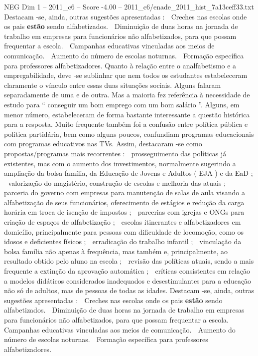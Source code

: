 \begin{textsample}{NEG Dim 1 – 2011\_c6 – Score -4.00 – 2011\_c6/enade\_2011\_hist\_7a13ceff33.txt}
Destacam -se, ainda, outras sugestões apresentadas :  Creches nas escolas onde os pais \textbf{estão} sendo alfabetizados.  Diminuição de duas horas na jornada de trabalho em empresas para funcionários não alfabetizados, para que possam frequentar a escola.  Campanhas educativas vinculadas aos meios de comunicação.  Aumento do número de escolas noturnas.  Formação específica para professores alfabetizadores.
Quanto à relação entre o analfabetismo e a empregabilidade, deve -se sublinhar que nem todos os estudantes estabeleceram claramente o vínculo entre essas duas situações sociais.
Alguns falaram separadamente de uma e de outra.
Mas a maioria fez referência à necessidade de estudo para “ conseguir um bom emprego com um bom salário ”.
Alguns, em menor número, estabeleceram de forma bastante interessante a questão histórica para a resposta.
Muito frequente também foi a confusão entre política pública e política partidária, bem como alguns poucos, confundiam programas educacionais com programas educativos nas TVs.
Assim, destacaram -se como propostas/programas mais recorrentes :  prosseguimento das políticas já existentes, mas com o aumento dos investimentos, normalmente sugerindo a ampliação da bolsa família, da Educação de Jovens e Adultos ( EJA ) e da EaD ;  valorização do magistério, construção de escolas e melhoria das atuais ;  parceria do governo com empresas para manutenção de salas de aula visando a alfabetização de seus funcionários, oferecimento de estágios e redução da carga horária em troca de isenção de impostos ;  parcerias com igrejas e ONGs para criação de espaços de alfabetização ;  escolas itinerantes e alfabetizadores em domicílio, principalmente para pessoas com dificuldade de locomoção, como os idosos e deficientes físicos ;  erradicação do trabalho infantil ;  vinculação da bolsa família não apenas à frequência, mas também e, principalmente, ao resultado obtido pelo aluno na escola ;  revisão das políticas atuais, sendo a mais frequente a extinção da aprovação automática ;  críticas consistentes em relação a modelos didáticos considerados inadequados e desestimulantes para a educação não só de adultos, mas de pessoas de todas as idades.
Destacam -se, ainda, outras sugestões apresentadas :  Creches nas escolas onde os pais \textbf{estão} sendo alfabetizados.  Diminuição de duas horas na jornada de trabalho em empresas para funcionários não alfabetizados, para que possam frequentar a escola.  Campanhas educativas vinculadas aos meios de comunicação.  Aumento do número de escolas noturnas.  Formação específica para professores alfabetizadores.

\end{textsample}
